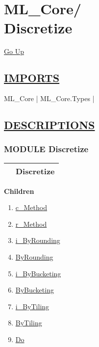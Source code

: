 \chapter*{\color{headfile}
{\large ML\_Core\slash\hspace{0pt}}
 \\
Discretize
}
\hypertarget{ecldoc:toc:ML_Core.Discretize}{}
\hyperlink{ecldoc:toc:root/ML_Core}{Go Up}

\section*{\underline{\textsf{IMPORTS}}}
\begin{doublespace}
{\large
ML\_Core |
ML\_Core.Types |
}
\end{doublespace}

\section*{\underline{\textsf{DESCRIPTIONS}}}
\subsection*{\textsf{\colorbox{headtoc}{\color{white} MODULE}
Discretize}}

\hypertarget{ecldoc:ML_Core.Discretize}{}

{\renewcommand{\arraystretch}{1.5}
\begin{tabularx}{\textwidth}{|>{\raggedright\arraybackslash}l|X|}
\hline
\hspace{0pt}\mytexttt{\color{red} } & \textbf{Discretize} \\
\hline
\end{tabularx}
}

\par


\textbf{Children}
\begin{enumerate}
\item \hyperlink{ecldoc:ecldoc-c_Method}{c\_Method}
\item \hyperlink{ecldoc:ml_core.discretize.r_method}{r\_Method}
\item \hyperlink{ecldoc:ml_core.discretize.i_byrounding}{i\_ByRounding}
\item \hyperlink{ecldoc:ml_core.discretize.byrounding}{ByRounding}
\item \hyperlink{ecldoc:ml_core.discretize.i_bybucketing}{i\_ByBucketing}
\item \hyperlink{ecldoc:ml_core.discretize.bybucketing}{ByBucketing}
\item \hyperlink{ecldoc:ml_core.discretize.i_bytiling}{i\_ByTiling}
\item \hyperlink{ecldoc:ml_core.discretize.bytiling}{ByTiling}
\item \hyperlink{ecldoc:ml_core.discretize.do}{Do}
\end{enumerate}

